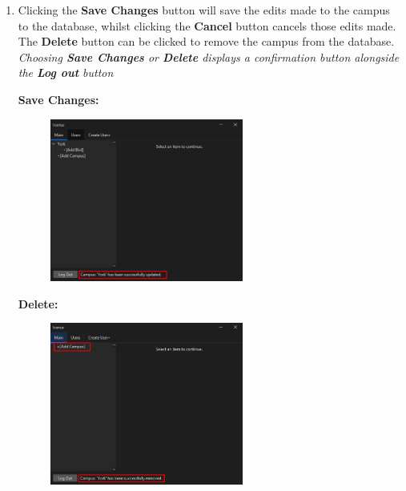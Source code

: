 \begin{enumerate}
    \item Clicking the \textbf{Save Changes} button will save the edits made to the campus to the database, whilst clicking the \textbf{Cancel} button cancels those edits made. The \textbf{Delete} button can be clicked to remove the campus from the database. \textit{Choosing \textbf{Save Changes} or \textbf{Delete} displays a confirmation button alongside the \textbf{Log out} button}

    \textbf{Save Changes:}
    \begin{figure}[H]
        \centering
        \includegraphics[width=0.6\textwidth]{MainTab/EditCampus/editCampusSave.PNG}
    \end{figure}

    \textbf{Delete:}
    \begin{figure}[H]
        \centering
        \includegraphics[width=0.6\textwidth]{MainTab/EditCampus/editCampusDelete.PNG}
    \end{figure}
\end{enumerate}

